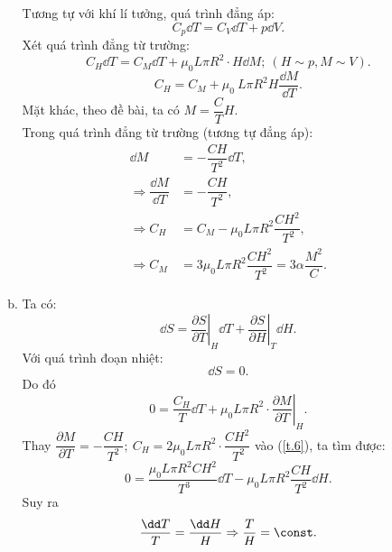 \begin{loigiai}
\begin{enumerate}[1)]
\begin{enumerate}[a)]
            
            Tương tự với khí lí tưởng, quá trình đẳng áp: 
            \[{{{C}}_{{p}}}{\dd T}={{{C}}_{{V}}}{\dd T}+{p\dd V}.\] 
            Xét quá trình đẳng từ trường: \[{{{C}}_{{H}}}{\dd T}={{{C}}_{{M}}}{\dd T}+{{\mu }_{0}}{L}\pi {{{R}}^{2}}\cdot {H\dd M}; ~ ({H}\sim{p},{M}\sim{V}).\]
            \[{{{C}}_{{H}}}={{{C}}_{{M}}}+{{\mu }_{0}}~{L}\pi {{{R}}^{2}}{H}\dfrac{{\dd M}}{{\dd T}}.\]
            Mặt khác, theo đề bài, ta có ${M}=\dfrac{{C}}{{T}}{H}$.\\
            Trong quá trình đẳng từ trường (tương tự đẳng áp):
            \[\begin{aligned}
                {\dd M} &=-\dfrac{{CH}}{{{{T}}^{2}}}{\dd}{T},\\
            \Rightarrow \dfrac{{\dd M}}{{\dd T}} & =-\dfrac{{CH}}{{{{T}}^{2}}},\\
            \Rightarrow {{{C}}_{{H}}} &= {{{C}}_{{M}}}-{{\mu }_{0}}{L}\pi {{{R}}^{2}}\dfrac{{C}{{{H}}^{2}}}{~{{{T}}^{2}}},\\
            \Rightarrow {{{C}}_{{M}}} &= 3{{\mu }_{0}}{L}\pi {{{R}}^{2}}\dfrac{{C}{{{H}}^{2}}}{~{{{T}}^{2}}}=3\alpha \dfrac{{{{M}}^{2}}}{{C}}.
            \end{aligned}\]

            \item Ta có: 
            \[{\dd S}={{\left. \dfrac{\partial {S}}{\partial {T}} \right|}_{{H}}}{\dd T}+{{\left. \dfrac{\partial {S}}{\partial {H}} \right|}_{{T}}}{\dd H}.\]
            Với quá trình đoạn nhiệt: \[{\dd S}=0.\]
            Do đó
            \[0=\dfrac{{{{C}}_{{H}}}}{{T}}{\dd T}+{{\mu }_{0}}{L}\pi {{{R}}^{2}}\cdot {{\left. \dfrac{\partial {M}}{\partial {T}} \right|}_{H}}. \tag{6}\label{t.6}\]
            Thay $\dfrac{\partial {M}}{\partial {T}}=-\dfrac{{CH}}{{{{T}}^{2}}};~{  }{{{C}}_{{H}}}=2{{\mu }_{0}}{L}\pi {{{R}}^{2}}\cdot \dfrac{{C}{{{H}}^{2}}}{~{{{T}}^{2}}}$ vào (\ref{t.6}), ta tìm được: 
            \[0=\dfrac{{{\mu }_{0}}{L}\pi {{{R}}^{2}}{C}{{{H}}^{2}}}{~{{{T}}^{3}}}{\dd T}-{{\mu }_{0}}{L}\pi {{{R}}^{2}}\dfrac{{CH}}{{{{T}}^{2}}}{\dd H}.\] 
            Suy ra \[\dfrac{{\dd T}}{{T}}=\dfrac{{\dd H}}{{H}}\Rightarrow \dfrac{{T}}{{H}}= \const.\]

        \end{enumerate}
    \end{enumerate}
\end{loigiai}



